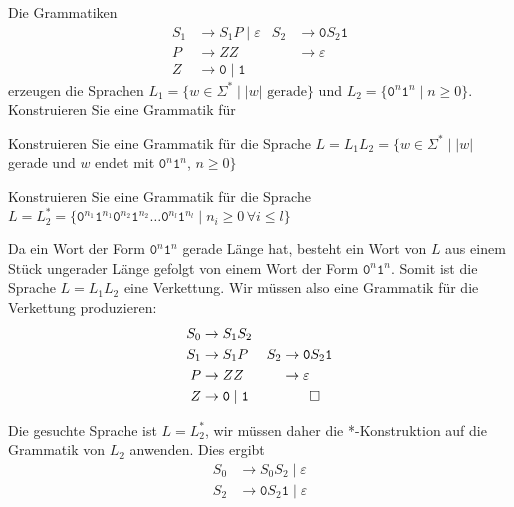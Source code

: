 Die Grammatiken
\begin{align*}
S_1 & \to S_1P \;|\; \varepsilon    & S_2 & \to \texttt{0}S_2\texttt{1}    \\
P   & \to ZZ                        &     & \to \varepsilon                \\
Z   & \to \texttt{0}\mid\texttt{1}  &     &                               
\end{align*}
erzeugen die Sprachen $L_1=\{w\in\Sigma^*\mid  \text{$|w|$ gerade}\}$
und $L_2=\{\texttt{0}^n\texttt{1}^n \mid n\ge 0\}$.
Konstruieren Sie eine Grammatik für
\begin{teilaufgaben}
\item Konstruieren Sie eine Grammatik für die Sprache $L=L_1L_2=\{
w\in\Sigma^* \mid
|w|$ gerade und $w$ endet mit $\texttt{0}^n\texttt{1}^n$, $n\ge 0 \}$
\item Konstruieren Sie eine Grammatik für die Sprache $L=L_2^*=\{
\texttt{0}^{n_1}\texttt{1}^{n_1}
\texttt{0}^{n_2}\texttt{1}^{n_2}
\dots
\texttt{0}^{n_l}\texttt{1}^{n_l}
\mid
n_i\ge 0\,\forall i\le l
\}$
\end{teilaufgaben}

\begin{loesung}
\begin{teilaufgaben}
\item
Da ein Wort der Form $\texttt{0}^n\texttt{1}^n$ gerade Länge hat, besteht
ein Wort von $L$ aus einem Stück ungerader Länge gefolgt von einem
Wort der Form $\texttt{0}^n\texttt{1}^n$.
Somit ist die Sprache $L=L_1L_2$ eine Verkettung.
Wir müssen also eine Grammatik für die Verkettung produzieren:
\begin{align*}
S_0 & \to S_1S_2                    &     &                                \\
S_1 & \to S_1P                      & S_2 & \to \texttt{0}S_2\texttt{1}    \\
P   & \to ZZ                        &     & \to \varepsilon                \\
Z   & \to \texttt{0}\mid\texttt{1}  &     &                               
\qedhere
\end{align*}
\item
Die gesuchte Sprache ist $L=L_2^*$, wir müssen daher die *-Konstruktion
auf die Grammatik von $L_2$ anwenden.
Dies ergibt 
\begin{align*}
S_0 & \to S_0S_2 \mid \varepsilon  \\
S_2 & \to \texttt{0}S_2\texttt{1} \mid \varepsilon
\end{align*}
\end{teilaufgaben}
\end{loesung}




